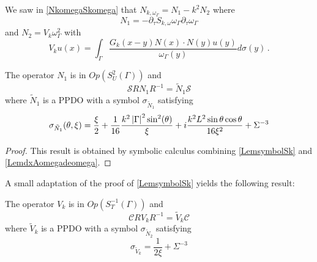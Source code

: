\documentclass[a4paper]{article}
\begin{document}
We saw in \autoref{NkomegaSkomega} that $N_{k,\omega_\Gamma} = N_1 - k^2N_2$ where 
\[N_1 = -\partial_\tau S_{k,\omega} \omega_\Gamma \partial_\tau \omega_\Gamma\]
and $N_2 = V_k\omega_\Gamma^2$ with
\[V_ku(x) = \int_{\Gamma} \frac{G_k(x-y)N(x)\cdot N(y) u(y)}{\omega_\Gamma(y)}d\sigma(y)\,.\]
\begin{Lem}
	\label{LemsymbolN1}
	The operator $N_1$ is in $\textit{Op}(S_U^2(\Gamma))$ and  
	\[\mathcal{S}RN_1R^{-1} = \tilde{N}_1 \mathcal{S}\]
	where $\tilde{N}_1$ is a PPDO with a symbol $\sigma_{\tilde{N}_1}$ satisfying
	\begin{equation}
		\sigma_{\tilde{N}_1}(\theta,\xi) = \frac{\xi}{2} + \frac{1}{16}\frac{k^2 \left\lvert \Gamma \right\rvert^2 \sin^2(\theta)}{\xi} + i\frac{k^2 L^2 \sin\theta\cos\theta}{16\xi^2} + \Sigma^{-3}
		\label{symboleN1}
	\end{equation}
\end{Lem}
\begin{proof}
This result is obtained by symbolic calculus combining \autoref{LemsymbolSk} and \autoref{LemdxAomegadeomega}.
\end{proof}
\noindent A small adaptation of the proof of \autoref{LemsymbolSk} yields the following result:
\begin{Lem}
	\label{LemsymbolVk}
	The operator $V_k$ is in $\textit{Op}(S_T^{-1}(\Gamma))$ and 
	\[\mathcal{C}RV_kR^{-1} = \tilde{V}_k \mathcal{C}\]
	where $\tilde{V}_k$ is a PPDO with a symbol $\sigma_{\tilde{N}_2}$ satisfying
	\[\sigma_{\tilde{V}_k} = \frac{1}{2\xi} + \Sigma^{-3}\]

\end{Lem}
\end{document}
